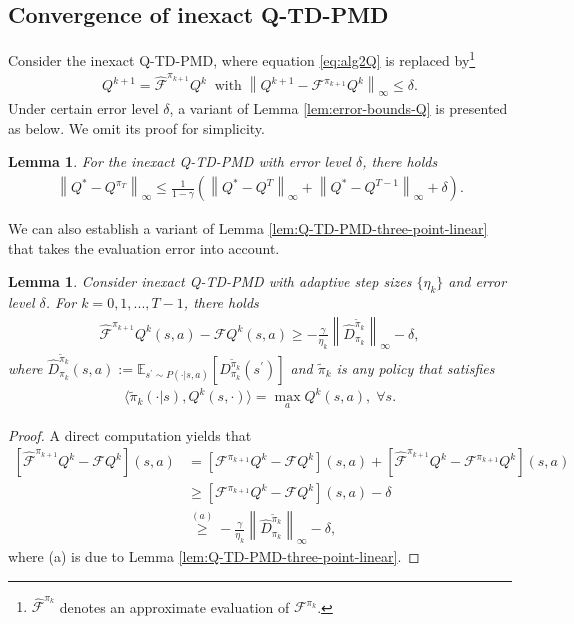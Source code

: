 \documentclass[10pt]{article}
\newcommand{\ls}{\left}
\newcommand{\rs}{\right}
\theoremstyle{plain}
\newtheorem{lemma}[theorem]{Lemma}
\theoremstyle{definition}
\begin{document}
\subsection{Convergence of inexact Q-TD-PMD}
Consider the inexact Q-TD-PMD, where equation \eqref{eq:alg2Q} is replaced by\footnote{$\widehat{\mathcal{F}}^{\pi_k}$ denotes an approximate evaluation of ${\mathcal{F}}^{\pi_k}$.}
\begin{align}
    Q^{k+1}=\hat{\mathcal{F}}^{\pi_{k+1}} Q^k \;\; \mbox{with} \; \left\|Q^{k+1}-\mathcal{F} ^{\pi _{k+1}}Q^k \right\| _{\infty}\le \delta.\label{Q-TD-PMD esitmation error}
\end{align}
Under certain error level $\delta$, a variant of Lemma \ref{lem:error-bounds-Q} is presented as below. We omit its proof for simplicity.
\begin{lemma}
    \label{lem:error-bounds-Q-error}
    For the inexact Q-TD-PMD with error level $\delta$, there holds 
    \begin{align}
        \ls\| Q^{*} - Q^{\pi_T} \rs\|_\infty \leq \frac{1}{1-\gamma} \ls( \ls\| Q^* - Q^T \rs\|_\infty + \ls\| Q^* - Q^{T-1} \rs\|_\infty+\delta\rs).
    \end{align}
\end{lemma}
We can also establish a variant of Lemma \ref{lem:Q-TD-PMD-three-point-linear} that takes the evaluation error into account.
\begin{lemma}
    \label{lem:Q-TD-PMD-three-point-linear-error}
Consider inexact Q-TD-PMD with adaptive step sizes $\{\eta_k\}$ and error level $\delta$.    For $k=0,1,...,T-1$, there holds
    \begin{align}
\hat{\mathcal{F}} ^{\pi _{k+1}}Q^k(s,a)-\mathcal{F} Q^k(s,a) \ge -\frac{\gamma}{\eta _k}\left\| \hat{D}_{\pi _k}^{\tilde{\pi}_k} \right\| _{\infty}-\delta,
        \label{eq:Q-TD-PMD-three-point-linear-error}
    \end{align}
    where $
\hat{D}_{\pi _k}^{\tilde{\pi}_k}\left( s,a \right) :=\mathbb{E} _{s^{\prime}\sim P\left( \cdot |s,a \right)}\left[ D_{\pi _k}^{\tilde{\pi}_k}\left( s^{\prime} \right) \right] $ and  $\tilde{\pi}_k$ is any policy that satisfies
    \begin{align*}
\langle\tilde{\pi}_k(\cdot|s),Q^k(s,\cdot)\rangle = \max_aQ^{k}(s,a),\;\forall s.
    \end{align*}
\end{lemma}
\begin{proof} A direct computation yields that 
\begin{align*}
\left[ \hat{\mathcal{F}}^{\pi _{k+1}}Q^k-\mathcal{F} Q^k \right] \left( s,a \right) &=\left[ \mathcal{F} ^{\pi _{k+1}}Q^k-\mathcal{F} Q^k \right] \left( s,a \right) +\left[ \hat{\mathcal{F}}^{\pi _{k+1}}Q^k-\mathcal{F} ^{\pi _{k+1}}Q^k \right] \left( s,a \right) 
\\
\,\,                             &\ge \left[ \mathcal{F} ^{\pi _{k+1}}Q^k-\mathcal{F} Q^k \right] \left( s,a \right) -\delta 
\\
\,\,                             &\overset{\left( a \right)}{\ge}-\frac{\gamma}{\eta _k}\left\| \hat{D}_{\pi _k}^{\tilde{\pi}_k} \right\| _{\infty}-\delta,
\end{align*}
where (a) is due to Lemma \ref{lem:Q-TD-PMD-three-point-linear}.
\end{proof}
\end{document}
